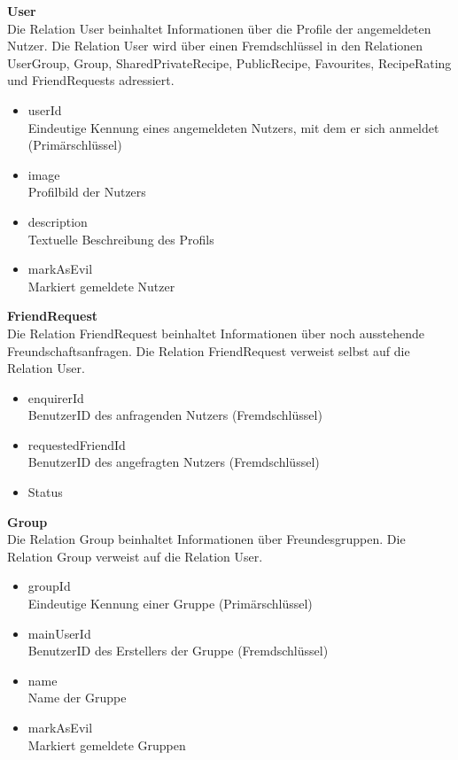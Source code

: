 \textbf{User}\\
Die Relation User beinhaltet Informationen über die Profile der angemeldeten Nutzer. Die Relation User wird über einen Fremdschlüssel in den Relationen UserGroup, Group, SharedPrivateRecipe, PublicRecipe, Favourites, RecipeRating und FriendRequests adressiert.

\begin{itemize}
 	\item userId \\ Eindeutige Kennung eines angemeldeten Nutzers, mit dem er sich anmeldet (Primärschlüssel)
 	\item image \\ Profilbild der Nutzers
 	\item description \\ Textuelle Beschreibung des Profils
 	\item markAsEvil \\ Markiert gemeldete Nutzer
\end{itemize}

\textbf{FriendRequest}\\
Die Relation FriendRequest beinhaltet Informationen über noch ausstehende Freundschaftsanfragen. Die Relation FriendRequest verweist selbst auf die Relation User.

\begin{itemize}
	\item enquirerId \\ BenutzerID des anfragenden Nutzers (Fremdschlüssel)
	\item requestedFriendId \\ BenutzerID des angefragten Nutzers (Fremdschlüssel)
	\item Status %
\end{itemize}

\textbf{Group}\\
Die Relation Group beinhaltet Informationen über Freundesgruppen. Die Relation Group verweist auf die Relation User.

\begin{itemize}
	\item groupId \\ Eindeutige Kennung einer Gruppe (Primärschlüssel)
	\item mainUserId \\ BenutzerID des Erstellers der Gruppe (Fremdschlüssel)
	\item name \\ Name der Gruppe
	\item markAsEvil \\ Markiert gemeldete Gruppen
\end{itemize}

